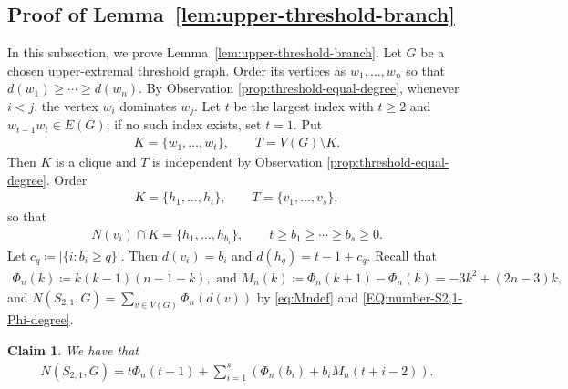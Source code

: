 \documentclass[10pt,a4paper]{article}
\newtheorem{claim}[definition]{Claim}
\begin{document}
\subsection{Proof of Lemma~\ref{lem:upper-threshold-branch}}\label{subsec:prove-lemma3.3}
In this subsection, we prove Lemma~\ref{lem:upper-threshold-branch}. 
    Let $G$ be a chosen upper-extremal threshold graph.  Order its vertices as $w_1,\ldots,w_n$ so that
    $d(w_1)\ge\cdots\ge d(w_n)$.  By Observation
    \ref{prop:threshold-equal-degree},
    whenever $i<j$, the vertex $w_i$ dominates $w_j$.  Let $t$ be the largest
    index with $t\ge2$ and $w_{t-1}w_t\in E(G)$; if no such index exists, set
    $t=1$.  Put
    \begin{align*}
      K=\{w_1,\ldots,w_t\},\qquad T=V(G)\setminus K.
    \end{align*}
    Then $K$ is a clique and $T$ is independent by Observation
    \ref{prop:threshold-equal-degree}.  Order
    \begin{align*}
      K=\{h_1,\ldots,h_t\},\qquad T=\{v_1,\ldots,v_s\},
    \end{align*}
    so that
    \begin{align*}
      N(v_i)\cap K=\{h_1,\ldots,h_{b_i}\},
      \qquad t\ge b_1\ge\cdots\ge b_s\ge0.
    \end{align*}
 Let $c_q\coloneqq|\{i:b_i\ge q\}|$.  Then $d(v_i)=b_i$ and $d(h_q)=t-1+c_q$. Recall that 
\begin{align*}
 \Phi_n(k)\coloneqq k(k-1)(n-1-k), \text{ and }  M_n(k)\coloneqq\Phi_n(k+1)-\Phi_n(k)=-3k^2+(2n-3)k, 
\end{align*} 
and $N(S_{2,1},G)=\sum_{v\in V(G)} \Phi_n(d(v))$ by \eqref{eq:Mndef} and \eqref{EQ:number-S2,1-Phi-degree}. 


 
    
    \begin{claim}\label{fact:threshold-exact-count}
       We have that 
        \begin{align}\label{eq:threshold-exact-upper}
          N(S_{2,1},G)=t\Phi_n(t-1)+\sum_{i=1}^s\left(\Phi_n(b_i)+b_iM_n(t+i-2)\right).
        \end{align}
    \end{claim}
    
\end{document}
